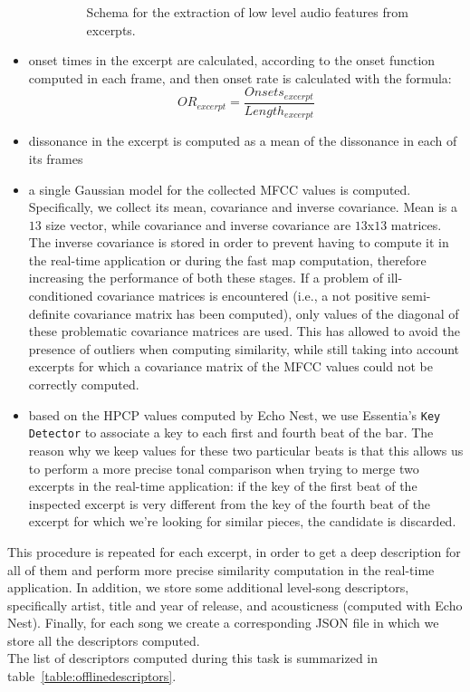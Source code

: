 \begin{itemize}
\begin{itemize}
\begin{figure}[h]
\caption[Schema for the extraction of low level features from excerpts]{Schema for the extraction of low level audio features from excerpts.}
\label{fig:extraction}
\end{figure}
\end{itemize}
\item onset times in the excerpt are calculated, according to the onset function computed in each frame, and then onset rate is calculated with the formula:
\begin{equation}
OR_{excerpt} = \frac{Onsets_{excerpt}}{Length_{excerpt}}
\end{equation}
\item dissonance in the excerpt is computed as a mean of the dissonance in each of its frames
\item a single Gaussian model for the collected MFCC values is computed. Specifically, we collect its mean, covariance and inverse covariance. Mean is a $13$ size vector, while covariance and inverse covariance are $13$x$13$ matrices. The inverse covariance is stored in order to prevent having to compute it in the real-time application or during the fast map computation, therefore increasing the performance of both these stages. If a problem of ill-conditioned covariance matrices is encountered (i.e., a not positive semi-definite covariance matrix has been computed), only values of the diagonal of these problematic covariance matrices are used. This has allowed to avoid the presence of outliers when computing similarity, while still taking into account excerpts for which a covariance matrix of the MFCC values could not be correctly computed. 
\item based on the HPCP values computed by Echo Nest, we use Essentia's \texttt{Key Detector} to associate a key to each first and fourth beat of the bar. The reason why we keep values for these two particular beats is that this allows us to perform a more precise tonal comparison when trying to merge two excerpts in the real-time application: if the key of the first beat of the inspected excerpt is very different from the key of the fourth beat of the excerpt for which we're looking for similar pieces, the candidate is discarded.
\end{itemize} 
This procedure is repeated for each excerpt, in order to get a deep description for all of them and perform more precise similarity computation in the real-time application. In addition, we store some additional level-song descriptors, specifically artist, title and year of release, and acousticness (computed with Echo Nest). Finally, for each song we create a corresponding JSON file in which we store all the descriptors computed. \\
The list of descriptors computed during this task is summarized in table~\ref{table:offlinedescriptors}.

